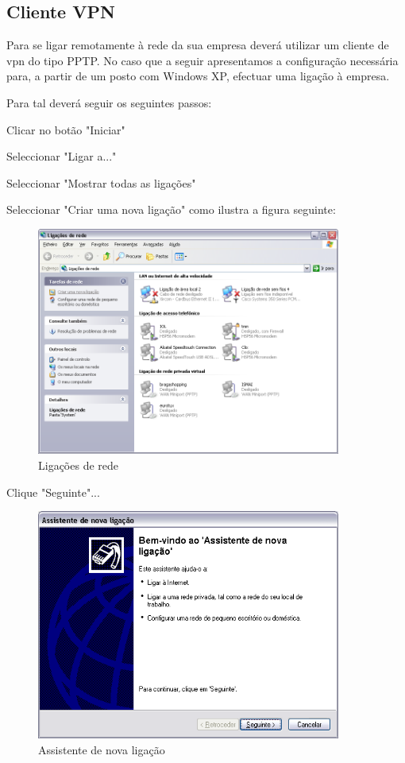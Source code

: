 \subsection{Cliente VPN}

Para se ligar remotamente à rede da sua empresa deverá utilizar um cliente de vpn do tipo PPTP. No caso que a seguir apresentamos a configuração necessária para, a partir de um posto com Windows XP, efectuar uma ligação à empresa.

Para tal deverá seguir os seguintes passos:

Clicar no botão "Iniciar"

Seleccionar "Ligar a..."

Seleccionar "Mostrar todas as ligações"

Seleccionar "Criar uma nova ligação" como ilustra a figura seguinte:

\begin{figure}[H]
    \begin{center}
        \includegraphics[width=10cm]{include/img/xp_f1}
    \end{center}
    \caption{Ligações de rede}
    \label{fig:XPF1}
\end{figure}

Clique "Seguinte"...

\begin{figure}[H]
    \begin{center}
        \includegraphics[width=10cm]{include/img/xp_f2}
    \end{center}
    \caption{Assistente de nova ligação}
    \label{fig:XPF2}
\end{figure}

